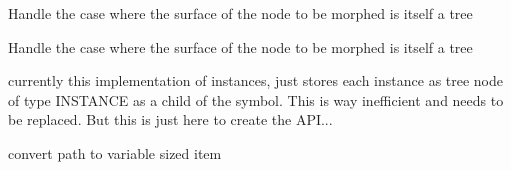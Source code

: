 
\begin{DoxyRefList}
\item[\label{todo__todo000003}%
\hypertarget{todo__todo000003}{}%
Global \hyperlink{tree_8h_affb8b0a4288458ba9b4788a5bbb713ef}{\+\_\+\+\_\+t\+\_\+morph} (\hyperlink{structTnode}{Tnode} $\ast$t, Symbol s, void $\ast$surface, size\+\_\+t length, int allocate)]Handle the case where the surface of the node to be morphed is itself a tree  
\item[\label{todo__todo000003}%
\hypertarget{todo__todo000003}{}%
Global \hyperlink{tree_8h_affb8b0a4288458ba9b4788a5bbb713ef}{\+\_\+\+\_\+t\+\_\+morph} (\hyperlink{structTnode}{Tnode} $\ast$t, Symbol s, void $\ast$surface, size\+\_\+t length, int allocate)]Handle the case where the surface of the node to be morphed is itself a tree  
\item[\label{todo__todo000002}%
\hypertarget{todo__todo000002}{}%
Global \hyperlink{receptor_8h_a7518a44dda01af81556bb6657f18ead4}{\+\_\+r\+\_\+new\+\_\+instance} (\hyperlink{structReceptor}{Receptor} $\ast$r, Symbol s, void $\ast$surface)]currently this implementation of instances, just stores each instance as tree node of type I\+N\+S\+T\+A\+N\+C\+E as a child of the symbol. This is way inefficient and needs to be replaced. But this is just here to create the A\+P\+I...  
\item[\label{todo__todo000001}%
\hypertarget{todo__todo000001}{}%
Class \hyperlink{structtable__elem}{table\+\_\+elem} ]convert path to variable sized item 
\end{DoxyRefList}